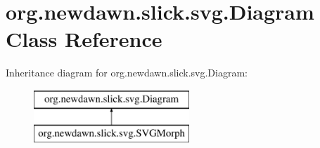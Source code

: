 \hypertarget{classorg_1_1newdawn_1_1slick_1_1svg_1_1_diagram}{}\section{org.\+newdawn.\+slick.\+svg.\+Diagram Class Reference}
\label{classorg_1_1newdawn_1_1slick_1_1svg_1_1_diagram}
Inheritance diagram for org.\+newdawn.\+slick.\+svg.\+Diagram\+:\begin{figure}[H]
\begin{center}
\leavevmode
\includegraphics[height=2.000000cm]{classorg_1_1newdawn_1_1slick_1_1svg_1_1_diagram}
\end{center}
\end{figure}
